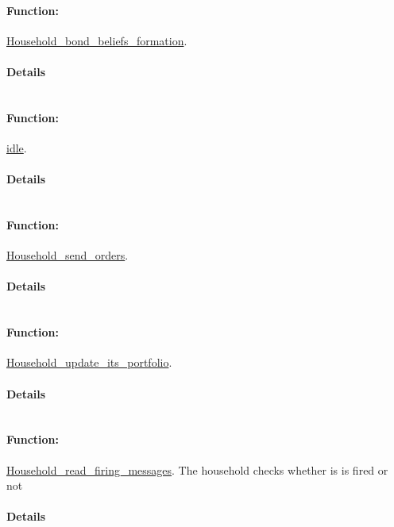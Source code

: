 \documentclass[a4paper,11pt]{article}
\begin{document}
\paragraph{Function:}\url{Household_bond_beliefs_formation}.

\paragraph{Details}
\begin{verbatim}
\end{verbatim}
\paragraph{Function:}\url{idle}.

\paragraph{Details}
\begin{verbatim}
\end{verbatim}
\paragraph{Function:}\url{Household_send_orders}.

\paragraph{Details}
\begin{verbatim}
\end{verbatim}
\paragraph{Function:}\url{Household_update_its_portfolio}.

\paragraph{Details}
\begin{verbatim}
\end{verbatim}
\paragraph{Function:}\url{Household_read_firing_messages}.
The household checks whether is is fired or not
\paragraph{Details}
\begin{verbatim}
\end{verbatim}
\end{document}
